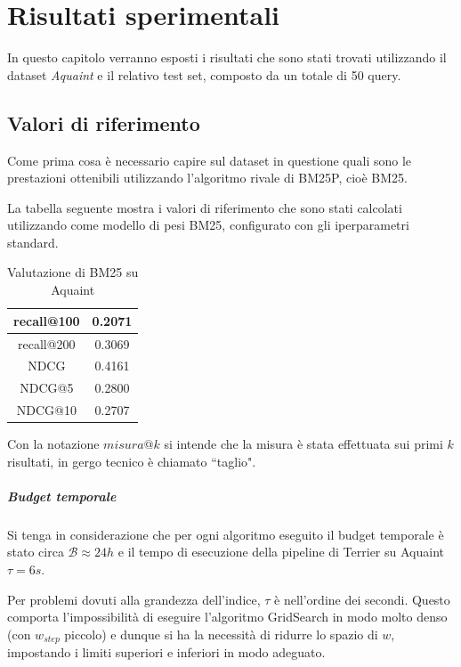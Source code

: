 \chapter{Risultati sperimentali}

In questo capitolo verranno esposti i risultati che sono stati trovati
utilizzando il dataset \textit{Aquaint} e il relativo test set, composto
da un totale di 50 query.

\section{Valori di riferimento}
Come prima cosa è necessario capire sul dataset in questione
quali sono le prestazioni ottenibili utilizzando l'algoritmo rivale di BM25P, cioè BM25.

La tabella seguente mostra i valori di riferimento che sono stati calcolati utilizzando come modello di pesi
BM25, configurato con gli iperparametri standard.

\begin{table}[h!]
	\centering
	\begin{tabular}{|c|c|}
		\hline
		recall@100 & 0.2071 \\
		\hline
		recall@200 & 0.3069 \\
		\hline
		NDCG & 0.4161 \\
		\hline
		NDCG@5 & 0.2800 \\
		\hline
		NDCG@10 & 0.2707 \\
		\hline
	\end{tabular}
\caption{Valutazione di BM25 su Aquaint}
\end{table}

Con la notazione $misura@k$ si intende che
la misura è stata effettuata sui primi $k$ risultati, in gergo tecnico
è chiamato ``taglio".

\paragraph{Budget temporale} Si tenga in considerazione che per ogni algoritmo
eseguito il budget temporale è stato circa $\mathcal{B} \approx 24h$
e il tempo di esecuzione della pipeline di Terrier su Aquaint $\tau = 6s$.

Per problemi dovuti alla grandezza dell'indice, $\tau$ è nell'ordine dei secondi.
Questo comporta l'impossibilità di eseguire l'algoritmo GridSearch
in modo molto denso (con $w_{step}$ piccolo) e dunque si ha la necessità
di ridurre lo spazio di $w$, impostando i limiti superiori e inferiori
in modo adeguato.


